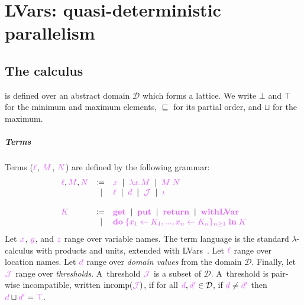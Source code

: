 \documentclass[main.tex]{subfiles}
\begin{document}
\chapter{LVars: quasi-deterministic parallelism}


\section{The \lambdalvar calculus}

\lambdalvar is defined over an abstract domain $\mathcal{D}$ which forms a lattice. We write $\bot$ and $\top$ for the minimum and maximum elements, $\sqsubseteq$ for its partial order, and $\sqcup$ for the maximum.

\paragraph*{Terms}
Terms ($\tm{\ell}$, $\tm{M}$, $\tm{N}$) are defined by the following grammar:
\[
  \begin{array}{lrll}
  \tm{\ell}, \tm{M}, \tm{N}
  & \coloneqq & \tm{x}
     \sep        \tm{\lambda x.M}
     \sep        \tm{M\;N}   \\
  & \sep      & \tm{\ell}
      \sep        \tm{d}
       \sep        \tmJ
       \sep       \tm{\iota}
  \\
  \\
   \tm{K}
  & \coloneqq & \tm{\lvarget}
    \sep        \tm{\lvarput}
    \sep        \tm{\return}
    \sep        \tm{\lvarrun} \\
    & \sep &        \tm{\doh{K_1}{K_n}{K}}
\end{array}
\]
Let $\tm{x}$, $\tm{y}$, and $\tm{z}$ range over variable names. The term language is the standard $\lambda$-calculus with products and units, extended with LVars~\citep{kuper15}. Let $\tm{\ell}$ range over location names. Let $\tm{d}$ range over \emph{domain values} from the domain $\mathcal{D}$. Finally, let $\tmJ$ range over \emph{thresholds}. A~threshold $\tmJ$ is a subset of $\mathcal{D}$. A~threshold is pair-wise incompatible, written $\incomp(\tmJ)$, if for all $\tm{d},\tm{d'}\in\mathcal{D}$, if $\tm{d}\neq\tm{d'}$ then $\tm{d}\sqcup\tm{d'}=\tm{\top}$.
\end{document}
